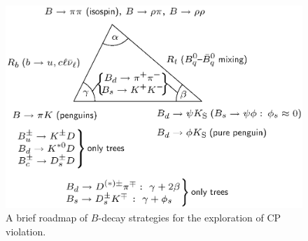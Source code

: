 \documentclass[12pt]{article}
\begin{document}
\begin{figure}
   \centering
   \includegraphics[width=9.0truecm]{flavour-map-bw.ps} 
   \caption{A brief roadmap of $B$-decay strategies for the exploration of
   CP violation.}
   \label{fig:flavour-map}
\end{figure}
\end{document}

